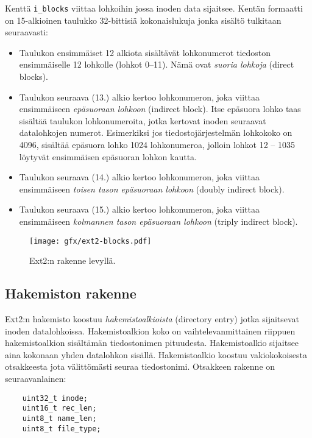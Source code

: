 Kenttä \texttt{i\_blocks} viittaa lohkoihin jossa inoden data sijaitsee.
Kentän formaatti on 15-alkioinen taulukko 32-bittisiä kokonaislukuja jonka sisältö tulkitaan seuraavasti:
\begin{itemize}
    \item Taulukon ensimmäiset 12 alkiota sisältävät lohkonumerot tiedoston ensimmäiselle 12 lohkolle (lohkot 0--11).
          Nämä ovat \emph{suoria lohkoja} (direct blocks).
    \item Taulukon seuraava (13.) alkio kertoo lohkonumeron, joka viittaa ensimmäiseen \emph{epäsuoraan lohkoon} (indirect block).
          Itse epäsuora lohko taas sisältää taulukon lohkonumeroita, jotka kertovat inoden seuraavat datalohkojen numerot.
          Esimerkiksi jos tiedostojärjestelmän lohkokoko on 4096, sisältää epäsuora lohko 1024 lohkonumeroa,
          jolloin lohkot 12 -- 1035 löytyvät ensimmäisen epäsuoran lohkon kautta.
    \item Taulukon seuraava (14.) alkio kertoo lohkonumeron, joka viittaa ensimmäiseen \emph{toisen tason epäsuoraan lohkoon} (doubly indirect block).

    \item Taulukon seuraava (15.) alkio kertoo lohkonumeron, joka viittaa ensimmäiseen \emph{kolmannen tason epäsuoraan lohkoon} (triply indirect block).
\end{itemize}

\begin{figure}
    \label{ext2_block_maps}
    \centering
    \texttt{[image: gfx/ext2-blocks.pdf]}
    \caption{Ext2:n rakenne levyllä.}
\end{figure}

\subsection{Hakemiston rakenne}
Ext2:n hakemisto koostuu \emph{hakemistoalkioista} (directory entry) jotka sijaitsevat inoden datalohkoissa.
Hakemistoalkion koko on vaihtelevanmittainen riippuen hakemistoalkion sisältämän tiedostonimen pituudesta.
Hakemistoalkio sijaitsee aina kokonaan yhden datalohkon sisällä.
Hakemistoalkio koostuu vakiokokoisesta otsakkeesta jota välittömästi seuraa tiedostonimi.
Otsakkeen rakenne on seuraavanlainen:

\begin{verbatim}
	uint32_t inode;
	uint16_t rec_len;
	uint8_t name_len;
	uint8_t file_type;
\end{verbatim}

